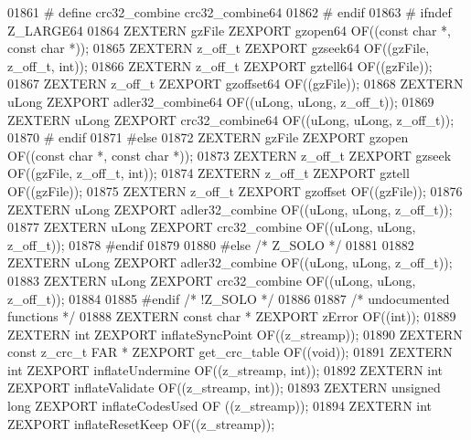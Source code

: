 \begin{DoxyCode}
01861 \textcolor{preprocessor}{#    define crc32\_combine crc32\_combine64}
01862 \textcolor{preprocessor}{#  endif}
01863 \textcolor{preprocessor}{#  ifndef Z\_LARGE64}
01864      ZEXTERN gzFile ZEXPORT gzopen64 OF((\textcolor{keyword}{const} \textcolor{keywordtype}{char} *, \textcolor{keyword}{const} \textcolor{keywordtype}{char} *));
01865      ZEXTERN z\_off\_t ZEXPORT gzseek64 OF((gzFile, z\_off\_t, \textcolor{keywordtype}{int}));
01866      ZEXTERN z\_off\_t ZEXPORT gztell64 OF((gzFile));
01867      ZEXTERN z\_off\_t ZEXPORT gzoffset64 OF((gzFile));
01868      ZEXTERN uLong ZEXPORT adler32\_combine64 OF((uLong, uLong, z\_off\_t));
01869      ZEXTERN uLong ZEXPORT crc32\_combine64 OF((uLong, uLong, z\_off\_t));
01870 \textcolor{preprocessor}{#  endif}
01871 \textcolor{preprocessor}{#else}
01872    ZEXTERN gzFile ZEXPORT gzopen OF((\textcolor{keyword}{const} \textcolor{keywordtype}{char} *, \textcolor{keyword}{const} \textcolor{keywordtype}{char} *));
01873    ZEXTERN z\_off\_t ZEXPORT gzseek OF((gzFile, z\_off\_t, \textcolor{keywordtype}{int}));
01874    ZEXTERN z\_off\_t ZEXPORT gztell OF((gzFile));
01875    ZEXTERN z\_off\_t ZEXPORT gzoffset OF((gzFile));
01876    ZEXTERN uLong ZEXPORT adler32\_combine OF((uLong, uLong, z\_off\_t));
01877    ZEXTERN uLong ZEXPORT crc32\_combine OF((uLong, uLong, z\_off\_t));
01878 \textcolor{preprocessor}{#endif}
01879 
01880 \textcolor{preprocessor}{#else }\textcolor{comment}{/* Z\_SOLO */}\textcolor{preprocessor}{}
01881 
01882    ZEXTERN uLong ZEXPORT adler32\_combine OF((uLong, uLong, z\_off\_t));
01883    ZEXTERN uLong ZEXPORT crc32\_combine OF((uLong, uLong, z\_off\_t));
01884 
01885 \textcolor{preprocessor}{#endif }\textcolor{comment}{/* !Z\_SOLO */}\textcolor{preprocessor}{}
01886 
01887 \textcolor{comment}{/* undocumented functions */}
01888 ZEXTERN \textcolor{keyword}{const} \textcolor{keywordtype}{char}   * ZEXPORT zError           OF((\textcolor{keywordtype}{int}));
01889 ZEXTERN \textcolor{keywordtype}{int}            ZEXPORT inflateSyncPoint OF((z\_streamp));
01890 ZEXTERN \textcolor{keyword}{const} z\_crc\_t FAR * ZEXPORT get\_crc\_table    OF((\textcolor{keywordtype}{void}));
01891 ZEXTERN \textcolor{keywordtype}{int}            ZEXPORT inflateUndermine OF((z\_streamp, \textcolor{keywordtype}{int}));
01892 ZEXTERN \textcolor{keywordtype}{int}            ZEXPORT inflateValidate OF((z\_streamp, \textcolor{keywordtype}{int}));
01893 ZEXTERN \textcolor{keywordtype}{unsigned} \textcolor{keywordtype}{long}  ZEXPORT inflateCodesUsed OF ((z\_streamp));
01894 ZEXTERN \textcolor{keywordtype}{int}            ZEXPORT inflateResetKeep OF((z\_streamp));

\end{DoxyCode}
